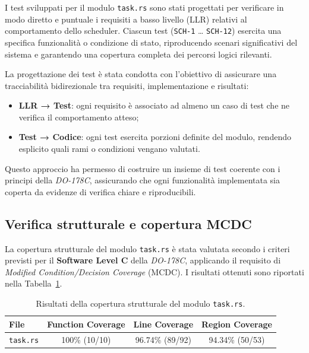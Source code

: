 \documentclass[italian, Lau, oneside]{sapthesis} %
\begin{document}
I test sviluppati per il modulo \texttt{task.rs} sono stati progettati per verificare in modo diretto e puntuale i requisiti a basso livello (LLR) relativi al comportamento dello scheduler.  
Ciascun test (\texttt{SCH-1} … \texttt{SCH-12}) esercita una specifica funzionalità o condizione di stato, riproducendo scenari significativi del sistema e garantendo una copertura completa dei percorsi logici rilevanti.

La progettazione dei test è stata condotta con l’obiettivo di assicurare una tracciabilità bidirezionale tra requisiti, implementazione e risultati:

\begin{itemize}
    \item \textbf{LLR → Test}: ogni requisito è associato ad almeno un caso di test che ne verifica il comportamento atteso;
    \item \textbf{Test → Codice}: ogni test esercita porzioni definite del modulo, rendendo esplicito quali rami o condizioni vengano valutati.
\end{itemize}

Questo approccio ha permesso di costruire un insieme di test coerente con i principi della \textit{DO-178C}, assicurando che ogni funzionalità implementata sia coperta da evidenze di verifica chiare e riproducibili.

\subsection{Verifica strutturale e copertura MCDC}

La copertura strutturale del modulo \texttt{task.rs} è stata valutata secondo i criteri previsti per il \textbf{Software Level C} della \textit{DO-178C}, applicando il requisito di \textit{Modified Condition/Decision Coverage} (MCDC). I risultati ottenuti sono riportati nella Tabella~\ref{tab:mcdc}.

\begin{table}[H]
\centering
\begin{tabular}{lccc}
\textbf{File} & \textbf{Function Coverage} & \textbf{Line Coverage} & \textbf{Region Coverage} \\
\hline
\texttt{task.rs} & 100\% (10/10) & 96.74\% (89/92) & 94.34\% (50/53) \\
\end{tabular}
\caption{Risultati della copertura strutturale del modulo \texttt{task.rs}.}
\label{tab:mcdc}
\end{table}
\end{document}
